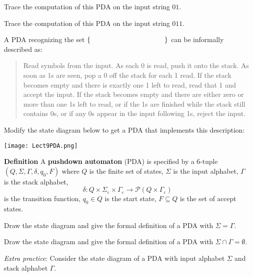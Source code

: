 \documentclass[12pt, oneside]{article}
\begin{document}
Trace the computation of this PDA on the input string $01$.

\vfill
    
Trace the computation of this PDA on the input string $011$.

\vfill


A PDA recognizing the set $\{ \hspace{1.5 in} \}$ can be informally described as:
\begin{quote}
    Read symbols from the input. As each 0 is read, push it onto the stack. 
    As soon as 1s are seen, pop a 0 off the stack for each 1 read. 
    If the stack becomes empty and there is exactly one 1 left to read, read that 1 and accept the input. 
    If the stack becomes empty and there are either zero or more than one 1s left to read, 
    or if the 1s are finished while the stack still contains 0s, or if any 0s appear in the input following 1s, 
    reject the input.
\end{quote}
Modify the state diagram below to get a PDA that implements this description:

\texttt{[image: Lect9PDA.png]}


\newpage
{\bf Definition} A {\bf pushdown automaton} (PDA) is  specified by a  $6$-tuple $(Q, \Sigma, \Gamma, \delta, q_0, F)$
where $Q$ is the finite set of states, $\Sigma$ is the input alphabet,  $\Gamma$ is the stack alphabet,
\[
    \delta: Q \times \Sigma_\varepsilon  \times  \Gamma_\varepsilon \to \mathcal{P}( Q \times \Gamma_\varepsilon)
\]
is the transition function,  $q_0 \in Q$ is the start state, $F \subseteq  Q$ is the set of accept states.
    

\vspace{90pt}
Draw the state diagram and give the formal definition of a PDA with $\Sigma = \Gamma$.

\vfill

Draw the state diagram and give the formal definition of a PDA with $\Sigma \cap \Gamma = \emptyset$.
    
\vfill

    
\newpage
{\it Extra practice}: Consider the state diagram of a PDA with input alphabet 
$\Sigma$ and stack alphabet $\Gamma$.
\end{document}
